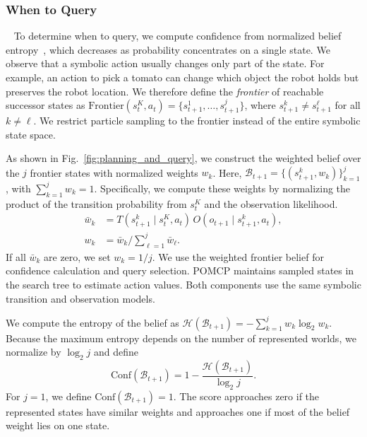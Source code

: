 

\subsubsection{When to Query}~\label{method:when}\label{method:belief_rep}
To determine when to query, we compute confidence from normalized belief entropy~\citep{qu2023stochastic}, which decreases as probability concentrates on a single state. We observe that a symbolic action usually changes only part of the state. For example, an action to pick a tomato can change which object the robot holds but preserves the robot location. We therefore define the \textit{frontier} of reachable successor states as $\mathrm{Frontier}(s_t^{K},a_t)=\{s_{t+1}^{1},\ldots,s_{t+1}^{j}\}$, where $s_{t+1}^{k}\neq s_{t+1}^{\ell}$ for all $k\neq\ell$. We restrict particle sampling to the frontier instead of the entire symbolic state space.

As shown in Fig.~\ref{fig:planning_and_query}, we construct the weighted belief over the $j$ frontier states with normalized weights $w_k$.
Here, $\mathcal{B}_{t+1}=\{(s_{t+1}^{k},w_k)\}_{k=1}^{j}$, with $\sum_{k=1}^{j}w_k=1.$
Specifically, we compute these weights by normalizing the product of the transition probability from $s_t^{K}$ and the observation likelihood.
\begin{equation}
\begin{aligned}
\bar{w}_{k}&=T(s_{t+1}^{k}\mid s_t^{K},a_t)\,O(o_{t+1}\mid s_{t+1}^{k},a_t),\\
w_k&=\bar{w}_k/\sum_{\ell=1}^{j}\bar{w}_{\ell}.
\end{aligned}
\label{eq:belief_update}
\end{equation}
If all $\bar{w}_k$ are zero, we set $w_k=1/j$. We use the weighted frontier belief for confidence calculation and query selection. POMCP maintains sampled states in the search tree to estimate action values. Both components use the same symbolic transition and observation models.

We compute the entropy of the belief as
$\mathcal{H}(\mathcal{B}_{t+1}) = -\sum_{k=1}^{j}w_k\log_2 w_k.$
Because the maximum entropy depends on the number of represented worlds, we normalize by $\log_2 j$ and define
\begin{equation}
\mathrm{Conf}(\mathcal{B}_{t+1}) = 1-\frac{\mathcal{H}(\mathcal{B}_{t+1})}{\log_2 j}.
\label{eq:compute_confidence}
\end{equation}
For $j=1$, we define $\mathrm{Conf}(\mathcal{B}_{t+1})=1$. The score approaches zero if the represented states have similar weights and approaches one if most of the belief weight lies on one state.

